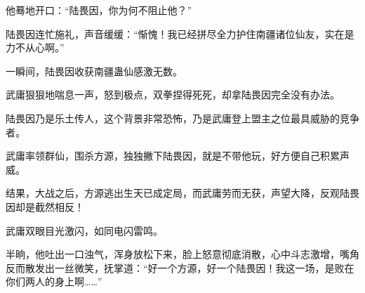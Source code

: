 \begin{this_body}
他蓦地开口：“陆畏因，你为何不阻止他？”

陆畏因连忙施礼，声音缓缓：“惭愧！我已经拼尽全力护住南疆诸位仙友，实在是力不从心啊。”

一瞬间，陆畏因收获南疆蛊仙感激无数。

武庸狠狠地喘息一声，怒到极点，双拳捏得死死，却拿陆畏因完全没有办法。

陆畏因乃是乐土传人，这个背景非常恐怖，乃是武庸登上盟主之位最具威胁的竞争者。

武庸率领群仙，围杀方源，独独撇下陆畏因，就是不带他玩，好方便自己积累声威。

结果，大战之后，方源逃出生天已成定局，而武庸劳而无获，声望大降，反观陆畏因却是截然相反！

武庸双眼目光激闪，如同电闪雷鸣。

半晌，他吐出一口浊气，浑身放松下来，脸上怒意彻底消散，心中斗志激增，嘴角反而散发出一丝微笑，抚掌道：“好一个方源，好一个陆畏因！我这一场，是败在你们两人的身上啊……”

\end{this_body}

